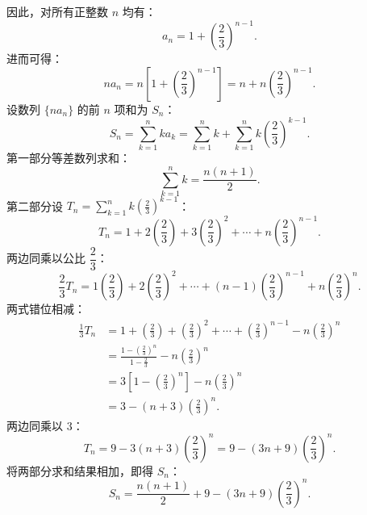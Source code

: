 \begin{answer}
因此，对所有正整数 $n$ 均有：
\nopagebreak[4]
\[
a_n = 1 + \left(\frac{2}{3}\right)^{n-1}.
\]
进而可得：
\nopagebreak[4]
\[
n a_n = n\left[1 + \left(\frac{2}{3}\right)^{n-1}\right] = n + n\left(\frac{2}{3}\right)^{n-1}.
\]
设数列 $\{n a_n\}$ 的前 $n$ 项和为 $S_n$：
\nopagebreak[4]
\[
S_n = \sum_{k=1}^n k a_k = \sum_{k=1}^n k + \sum_{k=1}^n k\left(\frac{2}{3}\right)^{k-1}.
\]
第一部分等差数列求和：
\nopagebreak[4]
\[
\sum_{k=1}^n k = \frac{n(n+1)}{2}.
\]
第二部分设 $T_n = \sum_{k=1}^n k\left(\frac{2}{3}\right)^{k-1}$：
\nopagebreak[4]
\[
T_n = 1 + 2\left(\frac{2}{3}\right) + 3\left(\frac{2}{3}\right)^2 + \cdots + n\left(\frac{2}{3}\right)^{n-1}.
\]
两边同乘以公比 $\dfrac{2}{3}$：
\nopagebreak[4]
\[
\frac{2}{3}T_n = 1\left(\frac{2}{3}\right) + 2\left(\frac{2}{3}\right)^2 + \cdots + (n-1)\left(\frac{2}{3}\right)^{n-1} + n\left(\frac{2}{3}\right)^n.
\]
两式错位相减：
\nopagebreak[4]
\[
\begin{aligned}
\frac{1}{3}T_n &= 1 + \left(\frac{2}{3}\right) + \left(\frac{2}{3}\right)^2 + \cdots + \left(\frac{2}{3}\right)^{n-1} - n\left(\frac{2}{3}\right)^n \\
&= \frac{1 - \left(\frac{2}{3}\right)^n}{1 - \frac{2}{3}} - n\left(\frac{2}{3}\right)^n \\
&= 3\left[1 - \left(\frac{2}{3}\right)^n\right] - n\left(\frac{2}{3}\right)^n \\
&= 3 - (n + 3)\left(\frac{2}{3}\right)^n.
\end{aligned}
\]
两边同乘以 $3$：
\nopagebreak[4]
\[
T_n = 9 - 3(n + 3)\left(\frac{2}{3}\right)^n = 9 - (3n + 9)\left(\frac{2}{3}\right)^n.
\]
将两部分求和结果相加，即得 $S_n$：
\nopagebreak[4]
\[
S_n = \frac{n(n+1)}{2} + 9 - (3n + 9)\left(\frac{2}{3}\right)^n.
\]



\end{answer}